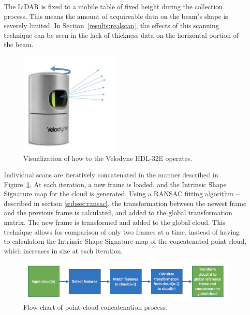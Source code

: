 \documentclass[12pt]{drexelthesis}
\begin{document}
The LiDAR is fixed to a mobile table of fixed height during the collection process. This means the amount of acquireable data on the beam's shape is severely limited. In Section~\ref{results:realscan}, the effects of this scanning technique can be seen in the lack of thickness data on the horizontal portion of the beam.

\begin{figure}[!ht]
	\centering
		\includegraphics[width=2in]{cloudCollection/velodyneLiDAR.jpg}
		\caption[Velodyne LiDAR Operation]{\centering Visualization of how to the Velodyne HDL-32E operates.}
\end{figure}

Individual scans are iteratively concatenated in the manner described in Figure~\ref{technical:lidarcompare}. At each iteration, a new frame is loaded, and the Intrinsic Shape Signature map for the cloud is generated. Using a RANSAC fitting algorithm -- described in section \ref{subsec:ransac}, the transformation between the newest frame and the previous frame is calculated, and added to the global transformation matrix. The new frame is transformed and added to the global cloud. This technique allows for comparison of only two frames at a time, instead of having to calculation the Intrinsic Shape Signature map of the concatenated point cloud, which increases in size at each iteration.

\begin{figure}[!ht]
	\centering
		\includegraphics[width=6in]{cloudCollection/cloud_concatenation.png}
		\caption[Flow chart of point cloud concatenation process.]{\centering Flow chart of point cloud concatenation process.}
	\label{technical:lidarcompare}
\end{figure}
\end{document}
